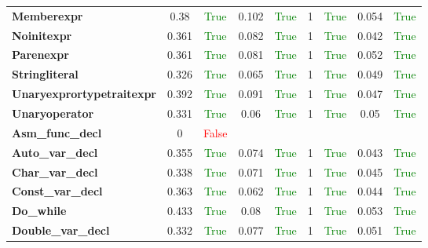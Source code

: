 \documentclass{article}
\begin{document}
\begin{xltabular}{\textwidth}{lcccccccc}
\textbf{{\fontsize{10}{12}\selectfont Memberexpr}}& 0.38&\textcolor{green}{True}& 0.102&\textcolor{green}{True}& 1&\textcolor{green}{True}& 0.054&\textcolor{green}{True} \\[0.5ex]
\textbf{{\fontsize{10}{12}\selectfont Noinitexpr}}& 0.361&\textcolor{green}{True}& 0.082&\textcolor{green}{True}& 1&\textcolor{green}{True}& 0.042&\textcolor{green}{True} \\[0.5ex]
\textbf{{\fontsize{10}{12}\selectfont Parenexpr}}& 0.361&\textcolor{green}{True}& 0.081&\textcolor{green}{True}& 1&\textcolor{green}{True}& 0.052&\textcolor{green}{True} \\[0.5ex]
\textbf{{\fontsize{10}{12}\selectfont Stringliteral}}& 0.326&\textcolor{green}{True}& 0.065&\textcolor{green}{True}& 1&\textcolor{green}{True}& 0.049&\textcolor{green}{True} \\[0.5ex]
\textbf{{\fontsize{10}{12}\selectfont Unaryexprortypetraitexpr}}& 0.392&\textcolor{green}{True}& 0.091&\textcolor{green}{True}& 1&\textcolor{green}{True}& 0.047&\textcolor{green}{True} \\[0.5ex]
\textbf{{\fontsize{10}{12}\selectfont Unaryoperator}}& 0.331&\textcolor{green}{True}& 0.06&\textcolor{green}{True}& 1&\textcolor{green}{True}& 0.05&\textcolor{green}{True} \\[0.5ex]
\textbf{{\fontsize{10}{12}\selectfont Asm\_func\_decl}}& 0&\textcolor{red}{False} \\[0.5ex]
\textbf{{\fontsize{10}{12}\selectfont Auto\_var\_decl}}& 0.355&\textcolor{green}{True}& 0.074&\textcolor{green}{True}& 1&\textcolor{green}{True}& 0.043&\textcolor{green}{True} \\[0.5ex]
\textbf{{\fontsize{10}{12}\selectfont Char\_var\_decl}}& 0.338&\textcolor{green}{True}& 0.071&\textcolor{green}{True}& 1&\textcolor{green}{True}& 0.045&\textcolor{green}{True} \\[0.5ex]
\textbf{{\fontsize{10}{12}\selectfont Const\_var\_decl}}& 0.363&\textcolor{green}{True}& 0.062&\textcolor{green}{True}& 1&\textcolor{green}{True}& 0.044&\textcolor{green}{True} \\[0.5ex]
\textbf{{\fontsize{10}{12}\selectfont Do\_while}}& 0.433&\textcolor{green}{True}& 0.08&\textcolor{green}{True}& 1&\textcolor{green}{True}& 0.053&\textcolor{green}{True} \\[0.5ex]
\textbf{{\fontsize{10}{12}\selectfont Double\_var\_decl}}& 0.332&\textcolor{green}{True}& 0.077&\textcolor{green}{True}& 1&\textcolor{green}{True}& 0.051&\textcolor{green}{True} \\[0.5ex]

\end{xltabular}
\end{document}
